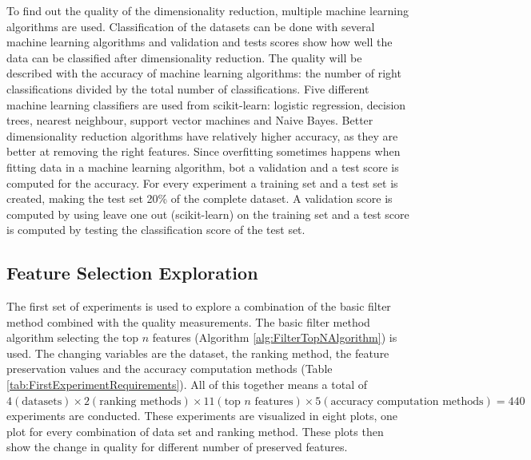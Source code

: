 \documentclass[10pt,a4paper]{article}
\begin{document}
	To find out the quality of the dimensionality reduction, multiple machine learning algorithms are used\cite{hall1998practical}.  Classification of the datasets can be done with several machine learning algorithms and validation and tests scores show how well the data can be classified after dimensionality reduction. The quality will be described with the accuracy of machine learning algorithms: the number of right classifications divided by the total number of classifications. Five different machine learning classifiers are used from scikit-learn: logistic regression, decision trees, nearest neighbour, support vector machines and Naive Bayes. Better dimensionality reduction algorithms have relatively higher accuracy, as they are better at removing the right features. Since overfitting sometimes happens when fitting data in a machine learning algorithm, bot a validation and a test score is computed for the accuracy. For every experiment a training set and a test set is created, making the test set 20\% of the complete dataset. A validation score is computed by using leave one out (scikit-learn) on the training set and a test score is computed by testing the classification score of the test set.
	
	\subsection{Feature Selection Exploration}
	\label{subsec:FeatureSelectionExploration}
	
	The first set of experiments is used to explore a combination of the basic filter method combined with the quality measurements. The basic filter method algorithm selecting the top $n$ features (Algorithm \ref{alg:FilterTopNAlgorithm}) is used. The changing variables are the dataset, the ranking method, the feature preservation values and the accuracy computation methods (Table \ref{tab:FirstExperimentRequirements}). All of this together means a total of $4 (\text{datasets}) \times 2 (\text{ranking methods}) \times 11 (\text{top } n \text{ features}) \times 5 (\text{accuracy computation methods}) = 440$ experiments are conducted. These experiments are visualized in eight plots, one plot for every combination of data set and ranking method. These plots then show the change in quality for different number of preserved features.
	
\end{document}
